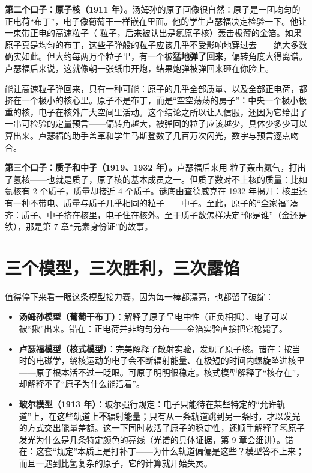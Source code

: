 \textbf{第二个口子：原子核（1911 年）。}汤姆孙的原子画像很自然：原子是一团均匀的正电荷“布丁”，电子像葡萄干一样嵌在里面。他的学生卢瑟福决定检验一下。他让一束带正电的高速粒子（\chem{\alpha} 粒子，后来被认出是氦原子核）轰击极薄的金箔。如果原子真是均匀的布丁，这些子弹般的粒子应该几乎不受影响地穿过去——绝大多数确实如此。但大约每两万个粒子里，有一个被\textbf{猛地弹了回来}，偏转角度大得离谱。卢瑟福后来说，这就像朝一张纸巾开炮，结果炮弹被弹回来砸在你脸上。

能让高速粒子弹回来，只有一种可能：原子的几乎全部质量、以及全部正电荷，都挤在一个极小的核心里。原子不是布丁，而是“空空荡荡的房子”：中央一个极小极重的核，电子在核外广大空间里活动。这个结论之所以让人信服，还因为它给出了一串可检验的定量预言——偏转角越大，被弹回的粒子应该越少，具体少多少可以算出来。卢瑟福的助手盖革和学生马斯登数了几百万次闪光，数字与预言逐点吻合。

\textbf{第三个口子：质子和中子（1919、1932 年）。}卢瑟福后来用 \chem{\alpha} 粒子轰击氮气，打出了氢核——也就是质子，原子核的基本成员之一。但质子数对不上核的质量：比如氦核有 2 个质子，质量却接近 4 个质子。谜底由查德威克在 1932 年揭开：核里还有一种不带电、质量与质子几乎相同的粒子——中子。至此，原子的“全家福”凑齐：质子、中子挤在核里，电子住在核外。至于质子数怎样决定“你是谁”（金还是铁），那是第 7 章“元素身份证”的故事。

\section{三个模型，三次胜利，三次露馅}

值得停下来看一眼这条模型接力赛，因为每一棒都漂亮，也都留了破绽：

\begin{itemize}[itemsep=2pt]
\item \textbf{汤姆孙模型（葡萄干布丁）}：解释了原子呈电中性（正负相抵）、电子可以被“揪”出来。错在：正电荷并非均匀分布——金箔实验直接把它枪毙了。
\item \textbf{卢瑟福模型（核式模型）}：完美解释了散射实验，发现了原子核。错在：按当时的电磁学，绕核运动的电子会不断辐射能量、在极短的时间内螺旋坠进核里——原子根本活不过一眨眼。可原子明明很稳定。核式模型解释了“核存在”，却解释不了“原子为什么能活着”。
\item \textbf{玻尔模型（1913 年）}：玻尔强行规定：电子只能待在某些特定的“允许轨道”上，在这些轨道上\textbf{不}辐射能量；只有从一条轨道跳到另一条时，才以发光的方式交出能量差额。这一下同时救活了原子的稳定性，还顺手解释了氢原子发光为什么是几条特定颜色的亮线（光谱的具体证据，第 9 章会细讲）。错在：这套“规定”本质上是打补丁——为什么轨道偏偏是这些？模型答不上来；而且一遇到比氢复杂的原子，它的计算就开始失灵。
\end{itemize}

